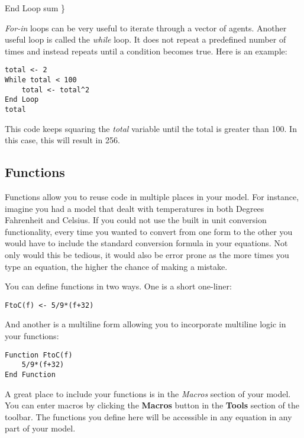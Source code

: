 \documentclass[]{memoir}
\renewcommand{\u}[1]{\textbf{#1}}
\begin{document}
End Loop sum \}

\emph{For-in} loops can be very useful to iterate through a vector of
agents. Another useful loop is called the \emph{while} loop. It does not
repeat a predefined number of times and instead repeats until a
condition becomes true. Here is an example:

\begin{lstlisting}
total <- 2
While total < 100
    total <- total^2
End Loop
total
\end{lstlisting}

This code keeps squaring the \emph{total} variable until the total is
greater than 100. In this case, this will result in 256.

\subsection{Functions}

Functions allow you to reuse code in multiple places in your model. For
instance, imagine you had a model that dealt with temperatures in both
Degrees Fahrenheit and Celsius. If you could not use the built in unit
conversion functionality, every time you wanted to convert from one form
to the other you would have to include the standard conversion formula
in your equations. Not only would this be tedious, it would also be
error prone as the more times you type an equation, the higher the
chance of making a mistake.

You can define functions in two ways. One is a short one-liner:

\lstinline!FtoC(f) <- 5/9*(f+32)!

And another is a multiline form allowing you to incorporate multiline
logic in your functions:

\begin{lstlisting}
Function FtoC(f)
    5/9*(f+32)
End Function
\end{lstlisting}

A great place to include your functions is in the \emph{Macros} section
of your model. You can enter macros by clicking the \u{Macros} button in
the \u{Tools} section of the toolbar. The functions you define here will
be accessible in any equation in any part of your model.

\end{document}

